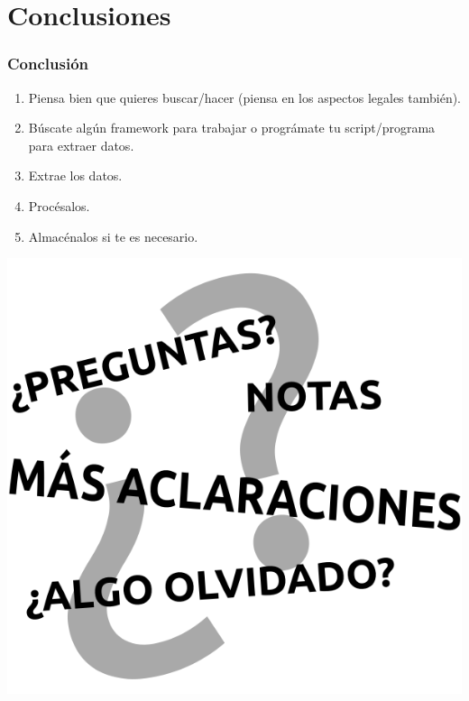 \documentclass{beamer}
\begin{document}
	\section{Conclusiones}
		\begin{frame}
			\frametitle{Conclusión}
			\begin{enumerate}
				\item Piensa bien que quieres buscar/hacer (piensa en los aspectos legales también).
				\item Búscate algún framework para trabajar o prográmate tu script/programa para extraer datos.
				\item Extrae los datos.
				\item Procésalos.
				\item Almacénalos si te es necesario.
			\end{enumerate}
 		\end{frame}
		\begin{frame}
			\begin{center}
				\includegraphics[height=\textheight, keepaspectratio=true]{Imagenes/PreguntasDudasAclaraciones.png}
			\end{center}
		\end{frame}
\end{document}
